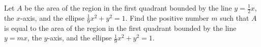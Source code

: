 Let $A$ be the area of the region in the first quadrant bounded by the
line $y = \frac{1}{2} x$, the $x$-axis, and the ellipse $\frac{1}{9} x^2
+ y^2 = 1$. Find the positive number $m$ such that $A$ is equal to the
area of the region in the first quadrant bounded by the line $y = mx$,
the $y$-axis, and the ellipse $\frac{1}{9} x^2 + y^2 = 1$.
